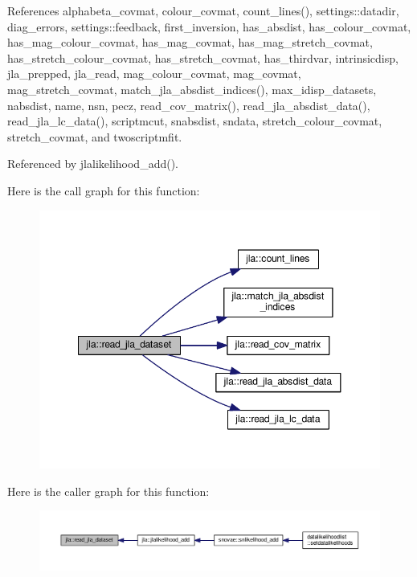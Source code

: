 References alphabeta\+\_\+covmat, colour\+\_\+covmat, count\+\_\+lines(), settings\+::datadir, diag\+\_\+errors, settings\+::feedback, first\+\_\+inversion, has\+\_\+absdist, has\+\_\+colour\+\_\+covmat, has\+\_\+mag\+\_\+colour\+\_\+covmat, has\+\_\+mag\+\_\+covmat, has\+\_\+mag\+\_\+stretch\+\_\+covmat, has\+\_\+stretch\+\_\+colour\+\_\+covmat, has\+\_\+stretch\+\_\+covmat, has\+\_\+thirdvar, intrinsicdisp, jla\+\_\+prepped, jla\+\_\+read, mag\+\_\+colour\+\_\+covmat, mag\+\_\+covmat, mag\+\_\+stretch\+\_\+covmat, match\+\_\+jla\+\_\+absdist\+\_\+indices(), max\+\_\+idisp\+\_\+datasets, nabsdist, name, nsn, pecz, read\+\_\+cov\+\_\+matrix(), read\+\_\+jla\+\_\+absdist\+\_\+data(), read\+\_\+jla\+\_\+lc\+\_\+data(), scriptmcut, snabsdist, sndata, stretch\+\_\+colour\+\_\+covmat, stretch\+\_\+covmat, and twoscriptmfit.



Referenced by jlalikelihood\+\_\+add().

Here is the call graph for this function\+:
\nopagebreak
\begin{figure}[H]
\begin{center}
\leavevmode
\includegraphics[width=348pt]{namespacejla_a3a08d66a30f511b1a63b006b9c1fac53_cgraph}
\end{center}
\end{figure}
Here is the caller graph for this function\+:
\nopagebreak
\begin{figure}[H]
\begin{center}
\leavevmode
\includegraphics[width=350pt]{namespacejla_a3a08d66a30f511b1a63b006b9c1fac53_icgraph}
\end{center}
\end{figure}
\mbox{\label{namespacejla_aadb5af8cc4301188cd29adc8b94a5bb0}} 
